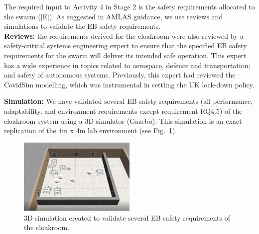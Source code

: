 \documentclass[lettersize,journal]{IEEEtran}
\begin{document}
The required input to Activity 4 in Stage 2 is the safety requirements allocated to the swarm ([E]). 
As suggested in AMLAS guidance, we use reviews and simulations to validate the EB safety requirements.\\

\textbf{Reviews:} the requirements derived for the cloakroom were also reviewed by a safety-critical systems engineering expert to ensure that the specified EB safety requirements for the swarm will deliver its intended safe operation. This expert has a wide experience in topics related to aerospace, defence and transportation; and safety of autonomous systems. Previously, this expert had reviewed the CovidSim modelling, which was instrumental in settling the UK lock-down policy. 

\textbf{Simulation: }We have validated several EB safety requirements (all performance, adaptability, and environment requirements except requirement RQ4.5) of the cloakroom system using a 3D simulator (Gazebo). This simulation is an exact replication of the 4m x 4m lab environment (see Fig.~\ref{3Dsim}). \\

\begin{figure}[!t]
	\centering
	\includegraphics[width=0.5\textwidth]{figures/3Dsim.png}
	\caption{3D simulation created to validate several EB safety requirements of the cloakroom.}
	\label{3Dsim}
\end{figure}
\end{document}
